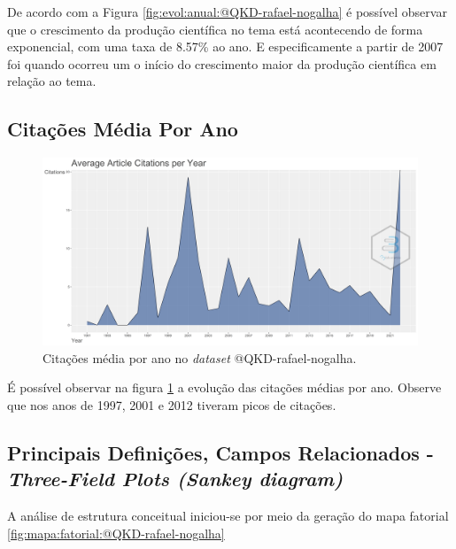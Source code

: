 De acordo com a Figura \ref{fig:evol:anual:@QKD-rafael-nogalha} é possível observar que o crescimento da produção científica no tema está acontecendo de forma exponencial, com uma taxa de 8.57\% ao ano. E especificamente a partir de 2007 foi quando ocorreu um o início do crescimento maior da produção científica em relação ao tema.

\subsection{Citações Média Por Ano}

\begin{figure}[H]
    \centering
    \includegraphics[width=1\textwidth]{experiments/rafaelnogalha/PesquisaBibliografica/QKDSegurancaComputacional/images/citacoes-media-por-ano.png}
    \caption{Citações média por ano no \textit{dataset} @QKD-rafael-nogalha.}
    \label{fig:citacoes:anual:@QKD-rafael-nogalha}
\end{figure}

É possível observar na figura \ref{fig:citacoes:anual:@QKD-rafael-nogalha} a evolução das citações médias por ano. Observe que nos anos de 1997, 2001 e 2012 tiveram picos de citações.

\subsection{Principais Definições, Campos Relacionados - \textit{Three-Field Plots (Sankey diagram)}}

A análise de estrutura conceitual iniciou-se por meio da geração do mapa fatorial \ref{fig:mapa:fatorial:@QKD-rafael-nogalha}

